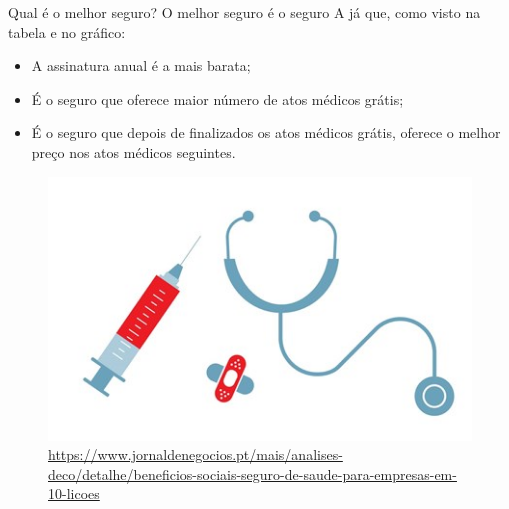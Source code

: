 \documentclass[11pt]{beamer}
\begin{document}
\begin{frame}{Qual é o melhor seguro?}
O melhor seguro é o seguro A já que, como visto na tabela e no gráfico:
\begin{itemize}
\item A assinatura anual é a mais barata;
\item É o seguro que oferece maior número de atos médicos grátis;
\item É o seguro que depois de finalizados os atos médicos grátis, oferece o melhor preço nos atos médicos seguintes.
\end{itemize}
\end{frame}
\begin{frame}
\begin{figure}[]
\centering
\includegraphics[scale=1]{BeamerSeguro.jpg}
\caption{\href{https://www.jornaldenegocios.pt/mais/analises-deco/detalhe/beneficios-sociais-seguro-de-saude-para-empresas-em-10-licoes}{https://www.jornaldenegocios.pt/mais/analises-deco/detalhe/beneficios-sociais-seguro-de-saude-para-empresas-em-10-licoes}}
\label{fig2}
\end{figure}
\end{frame}
\end{document}
